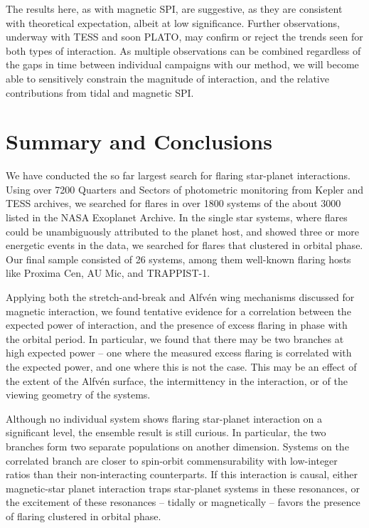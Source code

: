 \documentclass[twocolumn]{aastex631}
\begin{document}
The results here, as with magnetic SPI, are suggestive, as they are consistent with theoretical expectation, albeit at low significance. Further observations, underway with TESS and soon PLATO, may confirm or reject the trends seen for both types of interaction. As multiple observations can be combined regardless of the gaps in time between individual campaigns with our method, we will become able to sensitively constrain the magnitude of interaction, and the relative contributions from tidal and magnetic SPI.

\section{Summary and Conclusions}
\label{sec:summary}

We have conducted the so far largest search for flaring star-planet interactions. Using over 7200 Quarters and Sectors of photometric monitoring from Kepler and TESS archives, we searched for flares in over 1800 systems of the about 3000 listed in the NASA Exoplanet Archive. In the single star systems, where flares could be unambiguously attributed to the planet host, and showed three or more energetic events in the data, we searched for flares that clustered in orbital phase. Our final sample consisted of 26 systems, among them well-known flaring hosts like Proxima Cen, AU Mic, and TRAPPIST-1. 

Applying both the stretch-and-break and Alfv\'en wing mechanisms discussed for magnetic interaction, we found tentative evidence for a correlation between the expected power of interaction, and the presence of excess flaring in phase with the orbital period. In particular, we found that there may be two branches at high expected power -- one where the measured excess flaring is correlated with the expected power, and one where this is not the case. This may be an effect of the extent of the Alfv\'en surface, the intermittency in the interaction, or of the viewing geometry of the systems.

Although no individual system shows flaring star-planet interaction on a significant level, the ensemble result is still curious. In particular, the two branches form two separate populations on another dimension. Systems on the correlated branch are closer to spin-orbit commensurability with low-integer ratios than their non-interacting counterparts. If this interaction is causal, either magnetic-star planet interaction traps star-planet systems in these resonances, or the excitement of these resonances -- tidally or magnetically -- favors the presence of flaring clustered in orbital phase.
\end{document}
